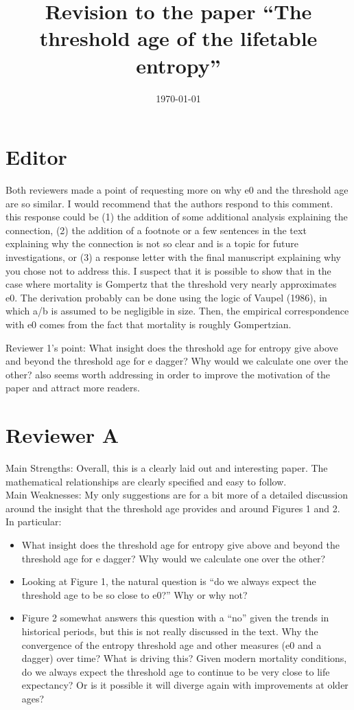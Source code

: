 \documentclass[a4paper,twoside, openright, 12pt, leqno]{article}
\title{Revision to the paper ``The threshold age of the lifetable entropy''}
\date{\today}
\begin{document}
\maketitle

\section*{Editor}
Both reviewers made a point of requesting more on why e0 and the threshold age are so similar. I would recommend that the authors respond to this comment. this response could be  (1) the addition of  some additional analysis explaining the connection, (2) the addition of  a footnote or a few sentences in the text explaining why the connection is not so clear and is a topic for future investigations, or (3) a response letter with the final manuscript explaining why you chose not to address this. I suspect that it is possible to show that in the case where mortality is Gompertz that the threshold very nearly approximates e0. The derivation probably can be done using the logic of Vaupel (1986), in which a/b is assumed to be negligible in size. Then, the empirical correspondence with e0 comes from the fact that mortality is roughly Gompertzian.
\linebreak

Reviewer 1’s point: What insight does the threshold age for entropy give above and beyond the threshold age for e dagger? Why would we calculate one over the other? also seems worth addressing in order to improve the motivation of the paper and attract more readers.


\section*{Reviewer A}
Main Strengths:
Overall, this is a clearly laid out and interesting paper. The mathematical relationships are clearly specified and easy to follow. \\

Main Weaknesses:
My only suggestions are for a bit more of a detailed discussion around the insight that the threshold age provides and around Figures 1 and 2. In particular:
\begin{itemize}
\item	What insight does the threshold age for entropy give above and beyond the threshold age for e dagger? Why would we calculate one over the other?
\item	Looking at Figure 1, the natural question is “do we always expect the threshold age to be so close to e0?” Why or why not?
\item	Figure 2 somewhat answers this question with a “no” given the trends in historical periods, but this is not really discussed in the text. Why the convergence of the entropy threshold age and other measures (e0 and a dagger) over time? What is driving this? Given modern mortality conditions, do we always expect the threshold age to continue to be very close to life expectancy? Or is it possible it will diverge again with improvements at older ages?
\end{itemize}
\end{document}
